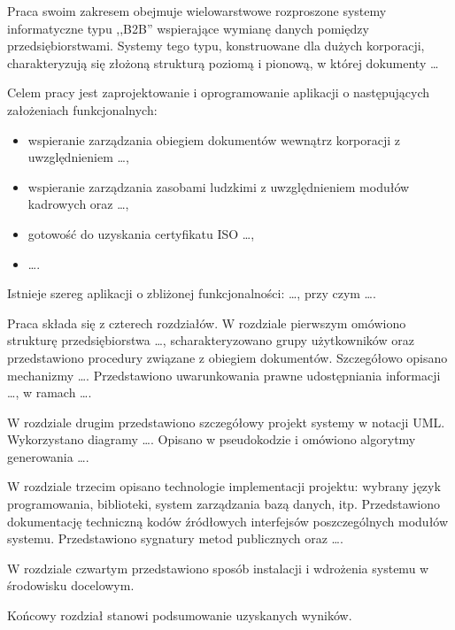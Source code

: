 {\color{dgray}
Praca swoim zakresem obejmuje wielowarstwowe rozproszone systemy informatyczne typu ,,B2B'' wspierające wymianę danych pomiędzy przedsiębiorstwami. Systemy tego typu, konstruowane dla dużych korporacji, charakteryzują się złożoną strukturą poziomą i pionową, w której dokumenty \ldots

Celem pracy jest zaprojektowanie i oprogramowanie aplikacji o następujących założeniach funkcjonalnych:
\begin{itemize}
    \item wspieranie zarządzania obiegiem dokumentów wewnątrz korporacji z uwzględnieniem \ldots,
	\item wspieranie zarządzania zasobami ludzkimi z uwzględnieniem modułów kadrowych oraz \ldots,
	\item gotowość do uzyskania certyfikatu ISO \ldots,
	\item \ldots.
\end{itemize}

Istnieje szereg aplikacji o zbliżonej funkcjonalności: \ldots, przy czym \ldots.

Praca składa się z czterech rozdziałów.
W rozdziale pierwszym omówiono strukturę przedsiębiorstwa \ldots, scharakteryzowano grupy użytkowników oraz przedstawiono procedury związane z obiegiem dokumentów. Szczegółowo opisano mechanizmy \ldots. Przedstawiono uwarunkowania prawne udostępniania informacji \ldots, w ramach \ldots.

W rozdziale drugim przedstawiono szczegółowy projekt systemy w notacji UML. Wykorzystano diagramy \ldots.
Opisano w pseudokodzie i omówiono algorytmy generowania \ldots.

W rozdziale trzecim opisano technologie implementacji projektu: wybrany język programowania, biblioteki, system zarządzania bazą danych, itp.  Przedstawiono dokumentację techniczną kodów źródłowych interfejsów poszczególnych modułów systemu. Przedstawiono sygnatury metod publicznych oraz \ldots.

W rozdziale czwartym przedstawiono sposób instalacji i wdrożenia systemu w środowisku docelowym.

Końcowy rozdział stanowi podsumowanie uzyskanych wyników.
}

